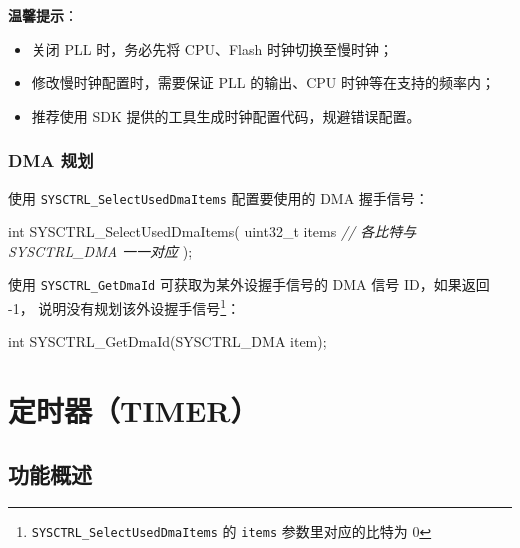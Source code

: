 \documentclass[
  12pt,
]{book}
\makeatletter
\newenvironment{Shaded}{\begin{snugshade}}{\end{snugshade}}
\newcommand{\CommentTok}[1]{\textcolor[rgb]{0.56,0.35,0.01}{\textit{#1}}}
\newcommand{\DataTypeTok}[1]{\textcolor[rgb]{0.13,0.29,0.53}{#1}}
\newcommand{\NormalTok}[1]{#1}
\providecommand{\tightlist}{%
  \setlength{\itemsep}{0pt}\setlength{\parskip}{0pt}}
\newenvironment{kframe}{%
\medskip{}
\setlength{\fboxsep}{.8em}
 \def\at@end@of@kframe{}%
 \ifinner\ifhmode%
  \def\at@end@of@kframe{\end{minipage}}%
  \begin{minipage}{\columnwidth}%
 \fi\fi%
 \def\FrameCommand##1{\hskip\@totalleftmargin \hskip-\fboxsep
 \colorbox{shadecolor}{##1}\hskip-\fboxsep
     \hskip-\linewidth \hskip-\@totalleftmargin \hskip\columnwidth}%
 \MakeFramed {\advance\hsize-\width
   \@totalleftmargin\z@ \linewidth\hsize
   \@setminipage}}%
 {\par\unskip\endMakeFramed%
 \at@end@of@kframe}
\newenvironment{rmdblock}[1]
  {
  \begin{itemize}
  \renewcommand{\labelitemi}{
    \raisebox{-.7\height}[0pt][0pt]{
      {\setkeys{Gin}{width=3em,keepaspectratio}\texttt{[image: images/\#1]}}
    }
  }
  \setlength{\fboxsep}{1em}
  \begin{kframe}
  \item
  }
  {
  \end{kframe}
  \end{itemize}
  }
\newenvironment{rmdnote}
  {\begin{rmdblock}{note}}
  {\end{rmdblock}}
\makeatother
\begin{document}
\begin{rmdnote}
\textbf{温馨提示}：

\begin{itemize}
\tightlist
\item
  关闭 PLL 时，务必先将 CPU、Flash 时钟切换至慢时钟；
\item
  修改慢时钟配置时，需要保证 PLL 的输出、CPU 时钟等在支持的频率内；
\item
  推荐使用 SDK 提供的工具生成时钟配置代码，规避错误配置。
\end{itemize}
\end{rmdnote}

\hypertarget{dma-ux89c4ux5212-1}{%
\subsection{DMA 规划}\label{dma-ux89c4ux5212-1}}

使用 \texttt{SYSCTRL\_SelectUsedDmaItems} 配置要使用的 DMA 握手信号：

\begin{Shaded}
\begin{Highlighting}[]
\DataTypeTok{int}\NormalTok{ SYSCTRL_SelectUsedDmaItems(}
  \DataTypeTok{uint32_t}\NormalTok{ items }\CommentTok{// 各比特与 SYSCTRL_DMA 一一对应}
\NormalTok{  );}
\end{Highlighting}
\end{Shaded}

使用 \texttt{SYSCTRL\_GetDmaId} 可获取为某外设握手信号的 DMA 信号 ID，如果返回 -1，
说明没有规划该外设握手信号\footnote{\texttt{SYSCTRL\_SelectUsedDmaItems} 的 \texttt{items} 参数里对应的比特为 0}：

\begin{Shaded}
\begin{Highlighting}[]
\DataTypeTok{int}\NormalTok{ SYSCTRL_GetDmaId(SYSCTRL_DMA item);}
\end{Highlighting}
\end{Shaded}

\hypertarget{ch-timer}{%
\chapter{定时器（TIMER）}\label{ch-timer}}

\hypertarget{ux529fux80fdux6982ux8ff0-5}{%
\section{功能概述}\label{ux529fux80fdux6982ux8ff0-5}}
\end{document}
